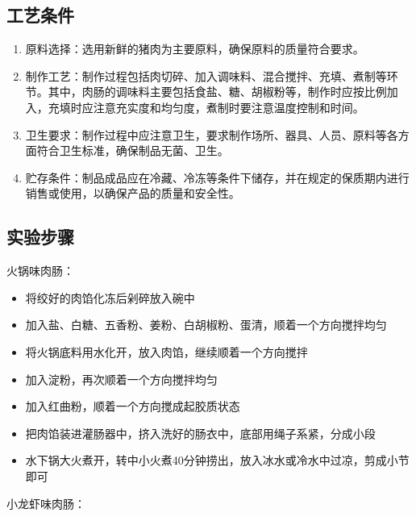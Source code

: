 \documentclass[UTF8]{ctexart}
\begin{document}
	\subsection{工艺条件}
	\begin{enumerate}
		\item 原料选择：选用新鲜的猪肉为主要原料，确保原料的质量符合要求。
		\item 制作工艺：制作过程包括肉切碎、加入调味料、混合搅拌、充填、煮制等环节。其中，肉肠的调味料主要包括食盐、糖、胡椒粉等，制作时应按比例加入，充填时应注意充实度和均匀度，煮制时要注意温度控制和时间。
		\item 卫生要求：制作过程中应注意卫生，要求制作场所、器具、人员、原料等各方面符合卫生标准，确保制品无菌、卫生。
		\item 贮存条件：制品成品应在冷藏、冷冻等条件下储存，并在规定的保质期内进行销售或使用，以确保产品的质量和安全性。
	\end{enumerate}

	\subsection{实验步骤}

	火锅味肉肠：

	\begin{itemize}
		\item 将绞好的肉馅化冻后剁碎放入碗中
		\item 加入盐、白糖、五香粉、姜粉、白胡椒粉、蛋清，顺着一个方向搅拌均匀
		\item 将火锅底料用水化开，放入肉馅，继续顺着一个方向搅拌
		\item 加入淀粉，再次顺着一个方向搅拌均匀
		\item 加入红曲粉，顺着一个方向搅成起胶质状态
		\item 把肉馅装进灌肠器中，挤入洗好的肠衣中，底部用绳子系紧，分成小段
		\item 水下锅大火煮开，转中小火煮40分钟捞出，放入冰水或冷水中过凉，剪成小节即可
	\end{itemize} 

	\quad

	小龙虾味肉肠：
\end{document}
